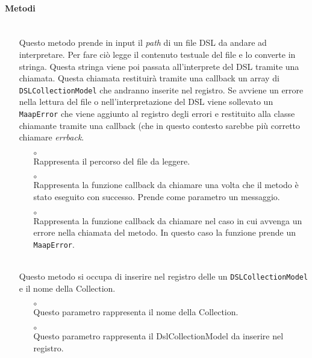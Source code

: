\paragraph*{Metodi}
\begin{itemize}
\item[]  \\ Questo metodo prende in input il \textit{path} di un file DSL da andare ad interpretare. Per fare ciò legge il contenuto testuale del file e lo converte in stringa. Questa stringa viene poi passata all'interprete del DSL tramite una chiamata. Questa chiamata restituirà tramite una callback un array di \texttt{DSLCollectionModel} che andranno inserite nel registro. Se avviene un errore nella lettura del file o nell'interpretazione del DSL viene sollevato un \texttt{MaapError} che viene aggiunto al registro degli errori e restituito alla classe chiamante tramite una callback (che in questo contesto sarebbe più corretto chiamare \textit{errback}.
\begin{itemize}\addtolength{\itemsep}{-0.5\baselineskip}
\item[$\circ$]  \\ Rappresenta il percorso del file da leggere.
\item[$\circ$]  \\ Rappresenta la funzione callback da chiamare una volta che il metodo è stato eseguito con successo. Prende come parametro un messaggio.
\item[$\circ$]  \\ Rappresenta la funzione callback da chiamare nel caso in cui avvenga un errore nella chiamata del metodo. In questo caso la funzione prende un \texttt{MaapError}.
\end{itemize}
\item[]  \\ Questo metodo si occupa di inserire nel registro delle  un \texttt{DSLCollectionModel} e il nome della Collection.
\begin{itemize}\addtolength{\itemsep}{-0.5\baselineskip}
\item[$\circ$]  \\ Questo parametro rappresenta il nome della Collection.
\item[$\circ$]  \\ Questo parametro rappresenta il DslCollectionModel da inserire nel registro.

\end{itemize}
\end{itemize}
